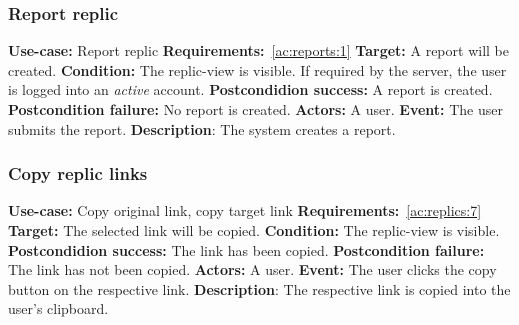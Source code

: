 \subsubsection{Report replic}\label{subsubsec:report-replic}
\textbf{Use-case:} Report replic \newline
\textbf{Requirements:}~\ref{ac:reports:1} \newline
\textbf{Target:} A report will be created. \newline
\textbf{Condition:} The replic-view is visible.
If required by the server, the user is logged into an \textit{active} account. \newline
\textbf{Postcondidion success:} A report is created. \newline
\textbf{Postcondition failure:} No report is created. \newline
\textbf{Actors:} A user. \newline
\textbf{Event:} The user submits the report. \newline
\textbf{Description}: The system creates a report.

\subsubsection{Copy replic links}\label{subsubsec:copy-replic-links}
\textbf{Use-case:} Copy original link, copy target link \newline
\textbf{Requirements:}~\ref{ac:replics:7} \newline
\textbf{Target:} The selected link will be copied. \newline
\textbf{Condition:} The replic-view is visible. \newline
\textbf{Postcondidion success:} The link has been copied. \newline
\textbf{Postcondition failure:} The link has not been copied. \newline
\textbf{Actors:} A user. \newline
\textbf{Event:} The user clicks the copy button on the respective link. \newline
\textbf{Description}: The respective link is copied into the user's clipboard.

